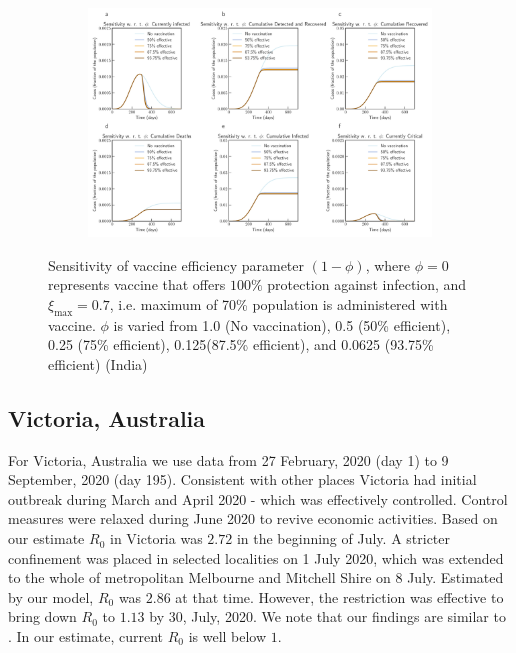 \documentclass[authoryear,preprint]{elsarticle}
\begin{document}
\begin{figure}[t!]
	\centering
	\begin{subfigure}[b]{\textwidth}
		\centering
		\includegraphics[width=1\linewidth]{India_scenario_vaccination0.7.pdf}
	\end{subfigure}
	\caption{Sensitivity of vaccine efficiency parameter $(1-\phi)$, where $\phi = 0$ represents vaccine that offers $100\%$ protection against infection, and $\xi_{\max} = 0.7$, i.e. maximum of 70\% population is administered with vaccine. $\phi$ is varied from 1.0 (No vaccination), 0.5 (50\% efficient), 0.25 (75\% efficient), 0.125(87.5\% efficient), and 0.0625 (93.75\% efficient) (India)}
	\label{fig9B} 
\end{figure}

\subsection{Victoria, Australia}
For Victoria, Australia we use data from 27 February, 2020 (day 1) to 9 September, 2020 (day 195). Consistent with other places Victoria had initial outbreak during March and April 2020 - which was effectively controlled.  Control measures were relaxed during June 2020 to revive economic activities.  Based on our estimate $R_0$ in Victoria was $2.72$ in the beginning of July.  A stricter confinement was placed in selected localities on 1 July 2020, which was extended to the whole of metropolitan Melbourne and Mitchell Shire on 8 July. Estimated by our model, $R_0$ was $2.86$ at that time. However, the restriction was effective to bring down $R_0$ to $1.13$ by 30, July, 2020. We note that our findings are similar to \cite{Saul2020}. In our estimate, current $R_0$ is well below $1$. 
\end{document}
